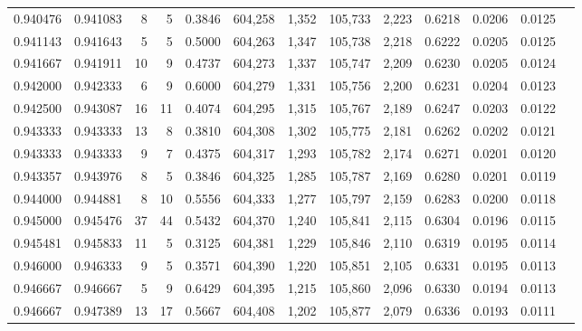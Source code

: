 \begin{tabular}{rrrrrrrrrrrrr}
0.940476 & 0.941083 &     8 &   5 &                                     0.3846 & 604,258 &   1,352 & 105,733 &   2,223 & 0.6218 & 0.0206 & 0.0125 \\
0.941143 & 0.941643 &     5 &   5 &                                     0.5000 & 604,263 &   1,347 & 105,738 &   2,218 & 0.6222 & 0.0205 & 0.0125 \\
0.941667 & 0.941911 &    10 &   9 &                                     0.4737 & 604,273 &   1,337 & 105,747 &   2,209 & 0.6230 & 0.0205 & 0.0124 \\
0.942000 & 0.942333 &     6 &   9 &                                     0.6000 & 604,279 &   1,331 & 105,756 &   2,200 & 0.6231 & 0.0204 & 0.0123 \\
0.942500 & 0.943087 &    16 &  11 &                                     0.4074 & 604,295 &   1,315 & 105,767 &   2,189 & 0.6247 & 0.0203 & 0.0122 \\
0.943333 & 0.943333 &    13 &   8 &                                     0.3810 & 604,308 &   1,302 & 105,775 &   2,181 & 0.6262 & 0.0202 & 0.0121 \\
0.943333 & 0.943333 &     9 &   7 &                                     0.4375 & 604,317 &   1,293 & 105,782 &   2,174 & 0.6271 & 0.0201 & 0.0120 \\
0.943357 & 0.943976 &     8 &   5 &                                     0.3846 & 604,325 &   1,285 & 105,787 &   2,169 & 0.6280 & 0.0201 & 0.0119 \\
0.944000 & 0.944881 &     8 &  10 &                                     0.5556 & 604,333 &   1,277 & 105,797 &   2,159 & 0.6283 & 0.0200 & 0.0118 \\
0.945000 & 0.945476 &    37 &  44 &                                     0.5432 & 604,370 &   1,240 & 105,841 &   2,115 & 0.6304 & 0.0196 & 0.0115 \\
0.945481 & 0.945833 &    11 &   5 &                                     0.3125 & 604,381 &   1,229 & 105,846 &   2,110 & 0.6319 & 0.0195 & 0.0114 \\
0.946000 & 0.946333 &     9 &   5 &                                     0.3571 & 604,390 &   1,220 & 105,851 &   2,105 & 0.6331 & 0.0195 & 0.0113 \\
0.946667 & 0.946667 &     5 &   9 &                                     0.6429 & 604,395 &   1,215 & 105,860 &   2,096 & 0.6330 & 0.0194 & 0.0113 \\
0.946667 & 0.947389 &    13 &  17 &                                     0.5667 & 604,408 &   1,202 & 105,877 &   2,079 & 0.6336 & 0.0193 & 0.0111 \\

\end{tabular}
